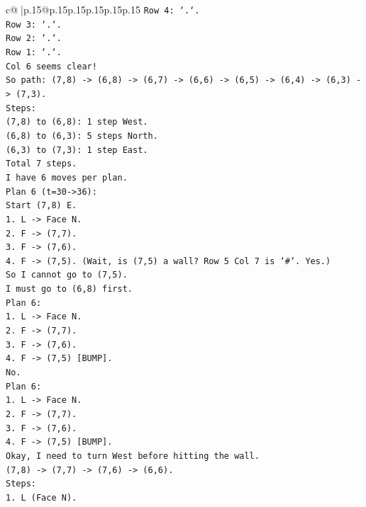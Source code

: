 \documentclass{article}
\begin{document}
{\begin{supertabular}{c@{$\;$}|p{.15\linewidth}@{}p{.15\linewidth}p{.15\linewidth}p{.15\linewidth}p{.15\linewidth}p{.15\linewidth}}
{{{\texttt{Row 4: `.`.} \\
\texttt{Row 3: `.`.} \\
\texttt{Row 2: `.`.} \\
\texttt{Row 1: `.`.} \\
\texttt{Col 6 seems clear!} \\
\texttt{So path: (7,8) {-}> (6,8) {-}> (6,7) {-}> (6,6) {-}> (6,5) {-}> (6,4) {-}> (6,3) {-}> (7,3).} \\
\texttt{Steps:} \\
\texttt{(7,8) to (6,8): 1 step West.} \\
\texttt{(6,8) to (6,3): 5 steps North.} \\
\texttt{(6,3) to (7,3): 1 step East.} \\
\texttt{Total 7 steps.} \\
\texttt{I have 6 moves per plan.} \\
\texttt{Plan 6 (t=30{-}>36):} \\
\texttt{Start (7,8) E.} \\
\texttt{1. L {-}> Face N.} \\
\texttt{2. F {-}> (7,7).} \\
\texttt{3. F {-}> (7,6).} \\
\texttt{4. F {-}> (7,5). (Wait, is (7,5) a wall? Row 5 Col 7 is `\#`. Yes.)} \\
\texttt{So I cannot go to (7,5).} \\
\texttt{I must go to (6,8) first.} \\
\texttt{Plan 6:} \\
\texttt{1. L {-}> Face N.} \\
\texttt{2. F {-}> (7,7).} \\
\texttt{3. F {-}> (7,6).} \\
\texttt{4. F {-}> (7,5) {[}BUMP{]}.} \\
\texttt{No.} \\
\texttt{Plan 6:} \\
\texttt{1. L {-}> Face N.} \\
\texttt{2. F {-}> (7,7).} \\
\texttt{3. F {-}> (7,6).} \\
\texttt{4. F {-}> (7,5) {[}BUMP{]}.} \\
\texttt{Okay, I need to turn West before hitting the wall.} \\
\texttt{(7,8) {-}> (7,7) {-}> (7,6) {-}> (6,6).} \\
\texttt{Steps:} \\
\texttt{1. L (Face N).} \\
}}}
\end{supertabular}}
\end{document}
